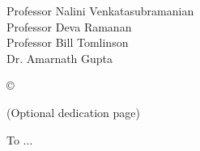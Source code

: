 



\othercommitteemembers
{
  Professor Nalini Venkatasubramanian\\
  Professor Deva Ramanan\\
  Professor Bill Tomlinson\\
  Dr. Amarnath Gupta
}


\copyrightdeclaration
{
  {\copyright} {\Degreeyear} \Authorname
}


\dedications
{
  (Optional dedication page)
  
  To ...
}

\acknowledgments
{
%  
%  
%  
}


\newcommand{\mypubentry}[3]{
  \begin{tabular*}{1\textwidth}{@{\extracolsep{\fill}}p{4.5in}r}
    \textbf{#1} & \textbf{#2} \\ 
    \multicolumn{2}{@{\extracolsep{\fill}}p{.95\textwidth}}{#3}\vspace{6pt} \\
  \end{tabular*}
}
\newcommand{\mysoftentry}[3]{
  \begin{tabular*}{1\textwidth}{@{\extracolsep{\fill}}lr}
    \textbf{#1} & \url{#2} \\
    \multicolumn{2}{@{\extracolsep{\fill}}p{.95\textwidth}}
    {\emph{#3}}\vspace{-6pt} \\
  \end{tabular*}
}


